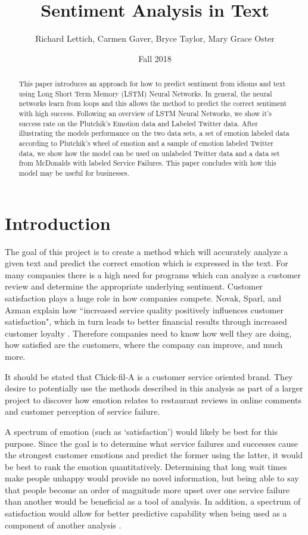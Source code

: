 \documentclass[titlepage,letterpaper]{article}
\title{Sentiment Analysis in Text}
\author{Richard Lettich, Carmen Gaver, Bryce Taylor, Mary Grace Oster}
\date{Fall 2018}
\begin{document}
\maketitle

\tableofcontents

\begin{abstract}
This paper introduces an approach for how to predict sentiment from idioms and text using Long Short Term Memory (LSTM) Neural Networks. In general, the neural networks learn from loops and this allows the method to predict the correct sentiment with high success. Following an overview of LSTM Neural Networks, we show it's success rate on the Plutchik's Emotion data and Labeled Twitter data. After illustrating the models performance on the two data sets, a set of emotion labeled data according to Plutchik's wheel of emotion and a sample of emotion labeled Twitter data, we show how the model can be used on unlabeled Twitter data and a data set from McDonalds with labeled Service Failures. This paper concludes with how this model may be useful for businesses.\\
\end{abstract}

\section{Introduction}

The goal of this project is to create a method which will accurately analyze a given text and predict the correct emotion which is expressed in the text. For many companies there is a high need for programs which can analyze a customer review and determine the appropriate underlying sentiment. Customer satisfaction plays a huge role in how companies compete. Novak, Sparl, and Azman explain how ``increased service quality positively influences customer satisfaction", which in turn leads to better financial results through increased customer loyalty \cite{BusinessCustomerSatisfaction}. Therefore companies need to know how well they are doing, how satisfied are the customers, where the company can improve, and much more.

It should be stated that Chick-fil-A is a customer service oriented brand. They desire to potentially use the methods described in this analysis as part of a larger project to discover how emotion relates to restaurant reviews in online comments and customer perception of service failure.

A spectrum of emotion (such as `satisfaction') would likely be best for this purpose. Since the goal is to determine what service failures and successes cause the strongest customer emotions and predict the former using the latter, it would be best to rank the emotion quantitatively. Determining that long wait times make people unhappy would provide no novel information, but being able to say that people become an order of magnitude more upset over one service failure than another would be beneficial as a tool of analysis. In addition, a spectrum of satisfaction would allow for better predictive capability when being used as a component of another analysis \cite{lowriwilliams}.
\end{document}
